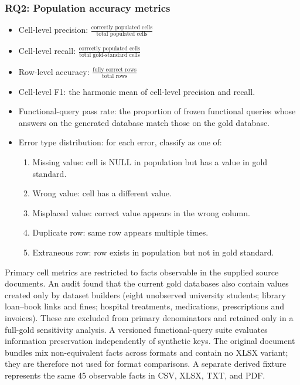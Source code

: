 \documentclass[11pt,a4paper]{article}
\begin{document}
\subsubsection{RQ2: Population accuracy metrics}
\begin{itemize}
  \item Cell-level precision: $\frac{\text{correctly populated cells}}{\text{total populated cells}}$
  \item Cell-level recall: $\frac{\text{correctly populated cells}}{\text{total gold-standard cells}}$
  \item Row-level accuracy: $\frac{\text{fully correct rows}}{\text{total rows}}$
  \item Cell-level F1: the harmonic mean of cell-level precision and recall.
  \item Functional-query pass rate: the proportion of frozen functional queries whose answers on the generated database match those on the gold database.
  \item Error type distribution: for each error, classify as one of:
    \begin{enumerate}
      \item Missing value: cell is NULL in population but has a value in gold standard.
      \item Wrong value: cell has a different value.
      \item Misplaced value: correct value appears in the wrong column.
      \item Duplicate row: same row appears multiple times.
      \item Extraneous row: row exists in population but not in gold standard.
    \end{enumerate}
\end{itemize}

Primary cell metrics are restricted to facts observable in the supplied source
documents. An audit found that the current gold databases also contain values
created only by dataset builders (eight unobserved university students; library
loan--book links and fines; hospital treatments, medications, prescriptions and
invoices). These are excluded from primary denominators and retained only in a
full-gold sensitivity analysis. A versioned functional-query suite evaluates
information preservation independently of synthetic keys. The original
document bundles mix non-equivalent facts across formats and contain no XLSX
variant; they are therefore not used for format comparisons. A separate
derived fixture represents the same 45 observable facts in CSV, XLSX, TXT, and
PDF.
\end{document}
